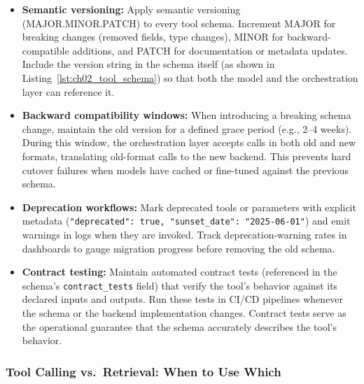 \begin{itemize}
  \item \textbf{Semantic versioning:} Apply semantic versioning (MAJOR.MINOR.PATCH) to every tool schema. Increment MAJOR for breaking changes (removed fields, type changes), MINOR for backward-compatible additions, and PATCH for documentation or metadata updates. Include the version string in the schema itself (as shown in Listing~\ref{lst:ch02_tool_schema}) so that both the model and the orchestration layer can reference it.

  \item \textbf{Backward compatibility windows:} When introducing a breaking schema change, maintain the old version for a defined grace period (e.g., 2--4 weeks). During this window, the orchestration layer accepts calls in both old and new formats, translating old-format calls to the new backend. This prevents hard cutover failures when models have cached or fine-tuned against the previous schema.

  \item \textbf{Deprecation workflows:} Mark deprecated tools or parameters with explicit metadata (\texttt{"deprecated": true, "sunset\_date": "2025-06-01"}) and emit warnings in logs when they are invoked. Track deprecation-warning rates in dashboards to gauge migration progress before removing the old schema.

  \item \textbf{Contract testing:} Maintain automated contract tests (referenced in the schema's \texttt{contract\_tests} field) that verify the tool's behavior against its declared inputs and outputs. Run these tests in CI/CD pipelines whenever the schema or the backend implementation changes. Contract tests serve as the operational guarantee that the schema accurately describes the tool's behavior.
\end{itemize}


\subsubsection{Tool Calling vs.\ Retrieval: When to Use Which}

